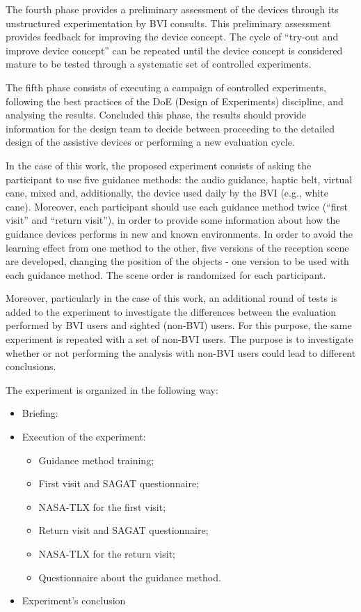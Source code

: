 The fourth phase provides a preliminary assessment of the devices through its unstructured experimentation by BVI consults. This preliminary assessment provides feedback for improving the device concept. The cycle of “try-out and improve device concept” can be repeated until the device concept is considered mature to be tested through a systematic set of controlled experiments.

The fifth phase consists of executing a campaign of controlled experiments, following the best practices of the DoE (Design of Experiments) discipline, and analysing the results. Concluded this phase, the results should provide information for the design team to decide between proceeding to the detailed design of the assistive devices or performing a new evaluation cycle.

In the case of this work, the proposed experiment consists of asking the participant to use five guidance methods: the audio guidance, haptic belt, virtual cane, mixed and, additionally, the device used daily by the BVI (e.g., white cane). Moreover, each participant should use each guidance method twice (“first visit” and “return visit”), in order to provide some information about how the guidance devices performs in new and known environments. In order to avoid the learning effect from one method to the other, five versions of the reception scene are developed, changing the position of the objects - one version to be used with each guidance method. The scene order is randomized for each participant.

Moreover, particularly in the case of this work, an additional round of tests is added to the experiment to investigate the differences between the evaluation performed by BVI users and sighted (non-BVI) users. For this purpose, the same experiment is repeated with a set of non-BVI users. The purpose is to investigate whether or not performing the analysis with non-BVI users could lead to different conclusions.

The experiment is organized in the following way:

\begin{itemize}
    \item Briefing:
    \item Execution of the experiment:
    \begin{itemize}
        \item Guidance method training;
        \item First visit and SAGAT questionnaire;
        \item NASA-TLX for the first visit;
        \item Return visit and SAGAT questionnaire;
        \item NASA-TLX for the return visit;
        \item Questionnaire about the guidance method.
    \end{itemize}
    \item Experiment's conclusion
\end{itemize}

